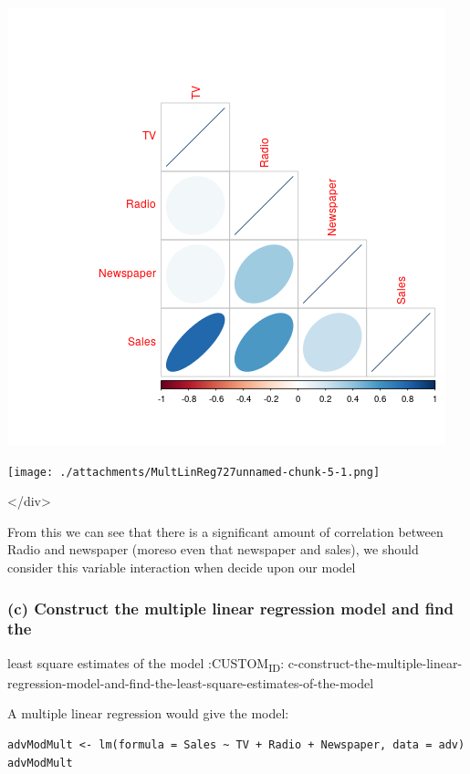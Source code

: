 \documentclass[11pt]{article}
\begin{document}
\begin{enumerate}
\begin{center}
\includegraphics[width=.9\linewidth]{CorrPlotMultLinReg.png}
\end{center}

\begin{center}
\texttt{[image: ./attachments/MultLinReg727unnamed-chunk-5-1.png]}
\end{center}

\begin{HTML}
</div>
\end{HTML}

From this we can see that there is a significant amount of correlation
between Radio and newspaper (moreso even that newspaper and sales), we
should consider this variable interaction when decide upon our model
\end{enumerate}

\subsubsection{(c) Construct the multiple linear regression model and find the}
\label{sec:org2d0fda3}
least square estimates of the model
:CUSTOM\textsubscript{ID}: c-construct-the-multiple-linear-regression-model-and-find-the-least-square-estimates-of-the-model

A multiple linear regression would give the model:

\begin{verbatim}
advModMult <- lm(formula = Sales ~ TV + Radio + Newspaper, data = adv)
advModMult
\end{verbatim}
\end{document}
